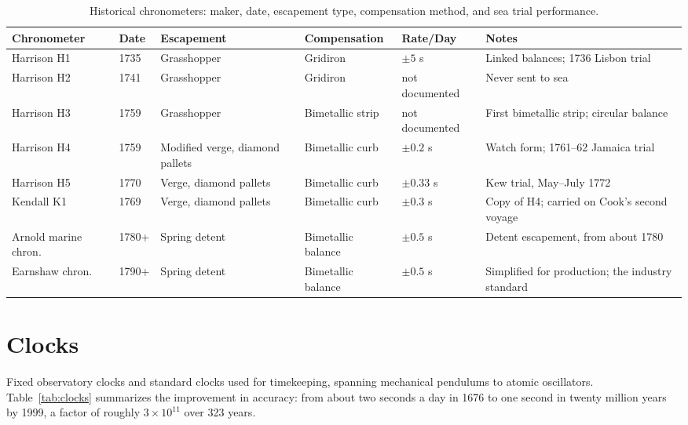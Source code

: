 \begin{table}
  \centering
  \caption{Historical chronometers: maker, date, escapement type, compensation method, and sea trial performance.}
  \label{tab:chronometers}
  \begin{tabularx}{\linewidth}{llXXlX}
    \toprule
    \textbf{Chronometer} & \textbf{Date} & \textbf{Escapement} & \textbf{Compensation} & \textbf{Rate/Day} & \textbf{Notes} \\
    \midrule
    Harrison H1 & 1735 & Grasshopper & Gridiron & $\pm 5$ s & Linked balances; 1736 Lisbon trial \\
    Harrison H2 & 1741 & Grasshopper & Gridiron & not documented & Never sent to sea \\
    Harrison H3 & 1759 & Grasshopper & Bimetallic strip & not documented & First bimetallic strip; circular balance \\
    Harrison H4 & 1759 & Modified verge, diamond pallets & Bimetallic curb & $\pm 0.2$ s & Watch form; 1761--62 Jamaica trial \\
    Harrison H5 & 1770 & Verge, diamond pallets & Bimetallic curb & $\pm 0.33$ s & Kew trial, May--July 1772 \\
    Kendall K1 & 1769 & Verge, diamond pallets & Bimetallic curb & $\pm 0.3$ s & Copy of H4; carried on Cook's second voyage \\
    Arnold marine chron. & 1780+ & Spring detent & Bimetallic balance & $\pm 0.5$ s & Detent escapement, from about 1780 \\
    Earnshaw chron. & 1790+ & Spring detent & Bimetallic balance & $\pm 0.5$ s & Simplified for production; the industry standard \\
    \bottomrule
  \end{tabularx}
\end{table}

\section{Clocks}

Fixed observatory clocks and standard clocks used for timekeeping, spanning mechanical pendulums to atomic oscillators. Table~\ref{tab:clocks} summarizes the improvement in accuracy: from about two seconds a day in 1676 to one second in twenty million years by 1999, a factor of roughly $3 \times 10^{11}$ over 323 years.

